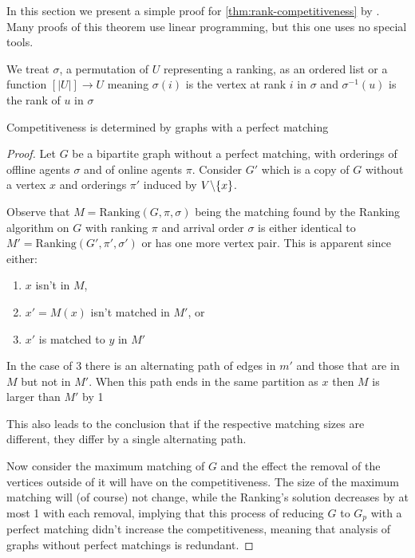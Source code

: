In this section we present a simple proof for \autoref{thm:rank-competitiveness} by \cite{obmSimple}. Many proofs of this theorem use linear programming, but this one uses no special tools.

We treat $\sigma$, a permutation of $U$ representing a ranking, as an ordered list or a function $[|U|]\to U$ meaning $\sigma(i)$ is the vertex at rank $i$ in $\sigma$ and $\sigma^{-1}(u)$ is the rank of $u$ in $\sigma$

\begin{lemma}
	\label{rank-cmp-compete-perfect}
	Competitiveness is determined by graphs with a perfect matching
\end{lemma}
\begin{proof}
	Let $G$ be a bipartite graph without a perfect matching, with orderings of offline agents $\sigma$ and of online agents $\pi$. Consider $G'$ which is a copy of $G$ without a vertex $x$ and orderings $\pi'$ induced by $V\backslash\{x\}$.

	Observe that $M=\mathrm{Ranking}(G,\pi,\sigma)$ being the matching found by the Ranking algorithm on $G$ with ranking $\pi$ and arrival order $\sigma$ is either identical to $M'=\mathrm{Ranking}(G',\pi',\sigma')$ or has one more vertex pair. This is apparent since either:
	\begin{enumerate}
		\item $x$ isn't in $M$,
		\item $x' = M(x)$ isn't matched in $M'$, or
		\item $x'$ is matched to $y$ in $M'$
	\end{enumerate}
	In the case of 3 there is an alternating path of edges in $m'$ and those that are in $M$ but not in $M'$. When this path ends in the same partition as $x$ then $M$ is larger than $M'$ by 1

	This also leads to the conclusion that if the respective matching sizes are different, they differ by  a single alternating path.

	Now consider the maximum matching of $G$ and the effect the removal of the vertices outside of it will have on the competitiveness.
	The size of the maximum matching will (of course) not change, while the Ranking's solution decreases by at most 1 with each removal, implying that this process of reducing $G$ to $G_p$ with a perfect matching didn't increase the competitiveness, meaning that analysis of graphs without perfect matchings is redundant.
\end{proof}

